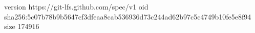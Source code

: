 version https://git-lfs.github.com/spec/v1
oid sha256:5c07b78b9b5647cf3dfeaa8cab536936d73c244ad62b97c5c4749b10fe5e8f94
size 174916
